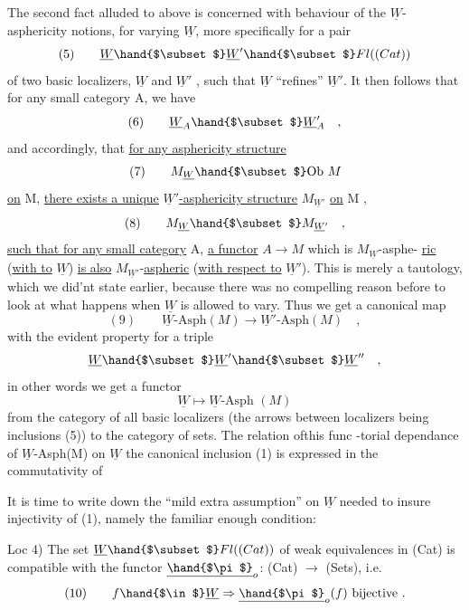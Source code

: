 
The second fact alluded to above is concerned with behaviour of the
$\underline{W}$-asphericity notions,  for varying $\underline{W}$,  more specifically for a pair
\[ (5) \qquad \underline{W} \hand{$\subset$} \underline{W}' \hand{$\subset$} Fl((Cat)) \]
of two basic localizers,  $\underline{W}$  and $\underline{W}'$ ,  such that $\underline{W}$  ``refines'' $\underline{W}'$.  It then
follows that for any small category A,  we have
\[ (6) \qquad \underline{W}_A \hand{$\subset$} \underline{W}'_A \quad , \]
and accordingly,  that \uline{for any asphericity structure}
\[ (7) \qquad M_{\underline{W}} \hand{$\subset$} \text{Ob } M \]
\uline{on} M,  \uline{there exists a unique} \uline{$\underline{W}'$-asphericity structure}  $M_{\underline{W}'}$ \uline{on} M ,
\[ (8) \qquad M_{\underline{W}} \hand{$\subset$} M_{\underline{W}'} \quad , \]
\uline{such that for any small category} A,  \uline{a functor} $A \to M$  which is $M_{\underline{W}}$-asphe-%
\uline{ric} (\uline{with  to} $\underline{W}$)  \uline{is also} $M_{\underline{W}'}$-\uline{aspheric} (\uline{with respect to} $\underline{W}'$).  This
is merely a tautology,  which we did'nt state earlier,  because there was
no compelling reason before to look at what happens when $\underline{W}$ is allowed to
vary.  Thus we get a canonical map
\[ (9) \qquad \underline{W}\text{-Asph}(M) \longrightarrow \underline{W}'\text{-Asph}(M) \quad , \]
with the evident  property for a triple
\[ \underline{W} \hand{$\subset$} \underline{W}' \hand{$\subset$} \underline{W}'' \quad , \]
in other words we get a functor
\[ \underline{W} \longmapsto \underline{W}\text{-Asph }(M) \]
from the category of all basic localizers (the arrows between localizers
being inclusions (5))  to the category of sets.  The relation of\hand{$|$}this func%
-torial dependance  of  $\underline{W}$-Asph(M) on $\underline{W}$   the canonical inclusion (1)
is expressed in the commutativity of

It is time to write down the ``mild extra assumption'' on $\underline{W}$ needed to
insure injectivity of (1),  namely the familiar enough condition:

Loc 4)  The set $\underline{W} \hand{$\subset$} Fl((Cat))$ of weak equivalences in (Cat)  is compatible
with the functor $\underline{\hand{$\pi$}}_o$: (Cat) $\to$ (Sets),  i.e.
\[ (10) \qquad f \hand{$\in$} \underline{W} \Rightarrow \underline{\hand{$\pi$}}_o(f) \text{  bijective .} \]


